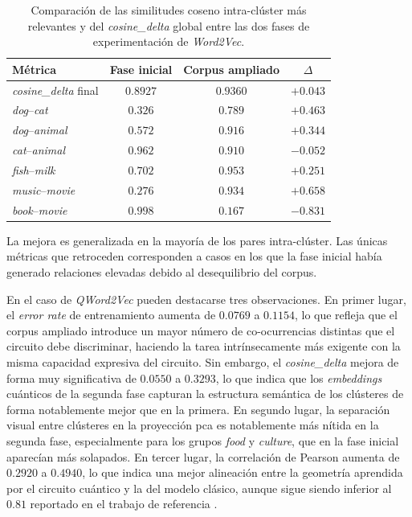 \begin{table}[h]
  \centering
  \begin{tabular}{|l|c|c|c|}
    \hline
    \textbf{Métrica}               & \textbf{Fase inicial} & \textbf{Corpus ampliado} & $\Delta$ \\
    \hline
    \textit{cosine\_delta} final   & $0.8927$              & $0.9360$                 & $+0.043$ \\
    \textit{dog}--\textit{cat}     & $0.326$               & $0.789$                  & $+0.463$ \\
    \textit{dog}--\textit{animal}  & $0.572$               & $0.916$                  & $+0.344$ \\
    \textit{cat}--\textit{animal}  & $0.962$               & $0.910$                  & $-0.052$ \\
    \textit{fish}--\textit{milk}   & $0.702$               & $0.953$                  & $+0.251$ \\
    \textit{music}--\textit{movie} & $0.276$               & $0.934$                  & $+0.658$ \\
    \textit{book}--\textit{movie}  & $0.998$               & $0.167$                  & $-0.831$ \\
    \hline
  \end{tabular}
  \caption{Comparación de las similitudes coseno intra-clúster más relevantes y del \textit{cosine\_delta} global entre las dos fases de experimentación de \textit{Word2Vec}.}
  \label{tab:comparacion_v1_v2}
\end{table}

La mejora es generalizada en la mayoría de los pares intra-clúster. Las únicas métricas que retroceden corresponden a casos en los que la fase inicial había generado relaciones elevadas debido al desequilibrio del corpus.

En el caso de \textit{QWord2Vec} pueden destacarse tres observaciones. En primer lugar, el \textit{error rate} de entrenamiento aumenta de $0.0769$ a $0.1154$, lo que refleja que el corpus ampliado introduce un mayor número de co-ocurrencias distintas que el circuito debe discriminar, haciendo la tarea intrínsecamente más exigente con la misma capacidad expresiva del circuito. Sin embargo, el \textit{cosine\_delta} mejora de forma muy significativa de $0.0550$ a $0.3293$, lo que indica que los \textit{embeddings} cuánticos de la segunda fase capturan la estructura semántica de los clústeres de forma notablemente mejor que en la primera. En segundo lugar, la separación visual entre clústeres en la proyección \gls{pca} es notablemente más nítida en la segunda fase, especialmente para los grupos \textit{food} y \textit{culture}, que en la fase inicial aparecían más solapados. En tercer lugar, la correlación de Pearson aumenta de $0.2920$ a $0.4940$, lo que indica una mejor alineación entre la geometría aprendida por el circuito cuántico y la del modelo clásico, aunque sigue siendo inferior al $0.81$ reportado en el trabajo de referencia \cite{ohno_qword2vec_2025}.

